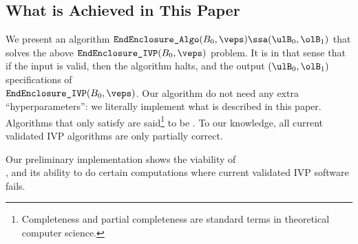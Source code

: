 \subsection{What is Achieved in This Paper}
	We present an algorithm
		$\ourAlgo(B_0,\veps)\ssa(\ulB_0,\olB_1)$
	that solves the above $\endEncIVP(B_0,\veps)$ problem.  It is
	 in that sense that if the input is valid,
	then  the algorithm halts, and
	 the output $(\ulB_0,\olB_1)$ specifications of \\
	$\endEncIVP(B_0,\veps)$.  Our algorithm do not
	need any extra ``hyperparameters'': we literally
	implement what is described in this paper.
	Algorithms that only satisfy 
	are said\footnote{
		Completeness and partial completeness are standard
		terms in theoretical computer science.
	} to be .
	To our knowledge, all current validated IVP algorithms 
	are only partially correct.

	Our preliminary implementation shows the
	viability of \\ \ourAlgo, and
	its ability to do certain computations where
	current validated IVP software fails.

